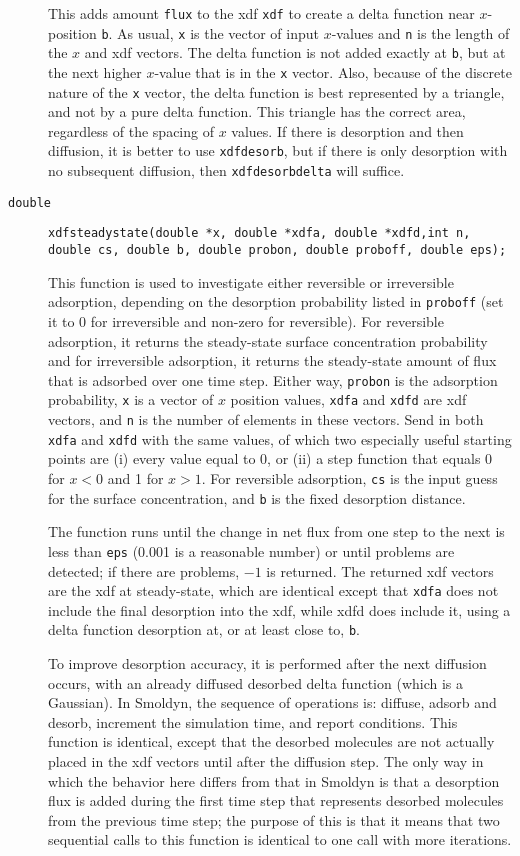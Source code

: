 \documentclass[11pt]{article}
\newcommand {\ttt} {\texttt}
\begin{document}
\begin{description}
This adds amount \ttt{flux} to the xdf \ttt{xdf} to create a delta function near $x$-position \ttt{b}. As usual, \ttt{x} is the vector of input $x$-values and \ttt{n} is the length of the $x$ and xdf vectors. The delta function is not added exactly at \ttt{b}, but at the next higher $x$-value that is in the \ttt{x} vector. Also, because of the discrete nature of the \ttt{x} vector, the delta function is best represented by a triangle, and not by a pure delta function. This triangle has the correct area, regardless of the spacing of $x$ values. If there is desorption and then diffusion, it is better to use \ttt{xdfdesorb}, but if there is only desorption with no subsequent diffusion, then \ttt{xdfdesorbdelta} will suffice.


\item[\ttt{double}]
\ttt{xdfsteadystate(double *x, double *xdfa, double *xdfd,int n, double cs, double b, double probon, double proboff, double eps);}

This function is used to investigate either reversible or irreversible adsorption, depending on the desorption probability listed in \ttt{proboff} (set it to 0 for irreversible and non-zero for reversible). For reversible adsorption, it returns the steady-state surface concentration probability and for irreversible adsorption, it returns the steady-state amount of flux that is adsorbed over one time step. Either way, \ttt{probon} is the adsorption probability, \ttt{x} is a vector of $x$ position values, \ttt{xdfa} and \ttt{xdfd} are xdf vectors, and \ttt{n} is the number of elements in these vectors. Send in both \ttt{xdfa} and \ttt{xdfd} with the same values, of which two especially useful starting points are (i) every value equal to 0, or (ii) a step function that equals 0 for $x < 0$ and 1 for $x > 1$. For reversible adsorption, \ttt{cs} is the input guess for the surface concentration, and \ttt{b} is the fixed desorption distance.

The function runs until the change in net flux from one step to the next is less than \ttt{eps} (0.001 is a reasonable number) or until problems are detected; if there are problems, $-1$ is returned. The returned xdf vectors are the xdf at steady-state, which are identical except that \ttt{xdfa} does not include the final desorption into the xdf, while xdfd does include it, using a delta function desorption at, or at least close to, \ttt{b}.

To improve desorption accuracy, it is performed after the next diffusion occurs, with an already diffused desorbed delta function (which is a Gaussian). In Smoldyn, the sequence of operations is: diffuse, adsorb and desorb, increment the simulation time, and report conditions. This function is identical, except that the desorbed molecules are not actually placed in the xdf vectors until after the diffusion step. The only way in which the behavior here differs from that in Smoldyn is that a desorption flux is added during the first time step that represents desorbed molecules from the previous time step; the purpose of this is that it means that two sequential calls to this function is identical to one call with more iterations.


\end{description}
\end{document}
